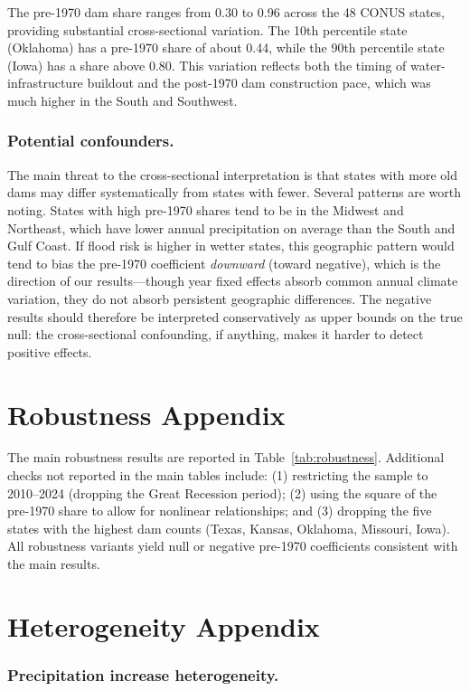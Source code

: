 \documentclass[12pt]{article}
\begin{document}
The pre-1970 dam share ranges from 0.30 to 0.96 across the 48 CONUS states, providing substantial cross-sectional variation. The 10th percentile state (Oklahoma) has a pre-1970 share of about 0.44, while the 90th percentile state (Iowa) has a share above 0.80. This variation reflects both the timing of water-infrastructure buildout and the post-1970 dam construction pace, which was much higher in the South and Southwest.

\subsubsection*{Potential confounders.}

The main threat to the cross-sectional interpretation is that states with more old dams may differ systematically from states with fewer. Several patterns are worth noting. States with high pre-1970 shares tend to be in the Midwest and Northeast, which have lower annual precipitation on average than the South and Gulf Coast. If flood risk is higher in wetter states, this geographic pattern would tend to bias the pre-1970 coefficient \emph{downward} (toward negative), which is the direction of our results---though year fixed effects absorb common annual climate variation, they do not absorb persistent geographic differences. The negative results should therefore be interpreted conservatively as upper bounds on the true null: the cross-sectional confounding, if anything, makes it harder to detect positive effects.

\section{Robustness Appendix}

The main robustness results are reported in Table~\ref{tab:robustness}. Additional checks not reported in the main tables include: (1) restricting the sample to 2010--2024 (dropping the Great Recession period); (2) using the square of the pre-1970 share to allow for nonlinear relationships; and (3) dropping the five states with the highest dam counts (Texas, Kansas, Oklahoma, Missouri, Iowa). All robustness variants yield null or negative pre-1970 coefficients consistent with the main results.

\section{Heterogeneity Appendix}

\subsubsection*{Precipitation increase heterogeneity.}
\end{document}
